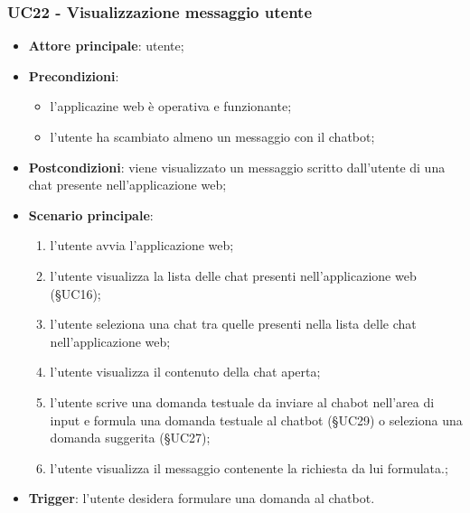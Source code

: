 \documentclass[10pt, a4paper]{article}
\begin{document}
    \subsubsection{UC22 - Visualizzazione messaggio utente}
    \begin{itemize}
        \item \textbf{Attore principale}: utente;
        \item \textbf{Precondizioni}: 
        \begin{itemize}
            \item l'applicazine web è operativa e funzionante;
            \item l'utente ha scambiato almeno un messaggio con il chatbot;
        \end{itemize}
        \item \textbf{Postcondizioni}: viene visualizzato un messaggio scritto dall'utente di una chat presente nell'applicazione web;
        \item \textbf{Scenario principale}:
            \begin{enumerate}
                \item l'utente avvia l'applicazione web;
                \item l'utente visualizza la lista delle chat presenti nell'applicazione web (\S UC16);
                \item l'utente seleziona una chat tra quelle presenti nella lista delle chat nell'applicazione web;
                \item l'utente visualizza il contenuto della chat aperta;
                \item l'utente scrive una domanda testuale da inviare al chabot nell'area di input e formula una domanda testuale al chatbot (\S UC29) o seleziona una domanda suggerita (\S UC27);
                \item l'utente visualizza il messaggio contenente la richiesta da lui formulata.;
            \end{enumerate}
        \item \textbf{Trigger}: l'utente desidera formulare una domanda al chatbot.
    \end{itemize}
\end{document}
